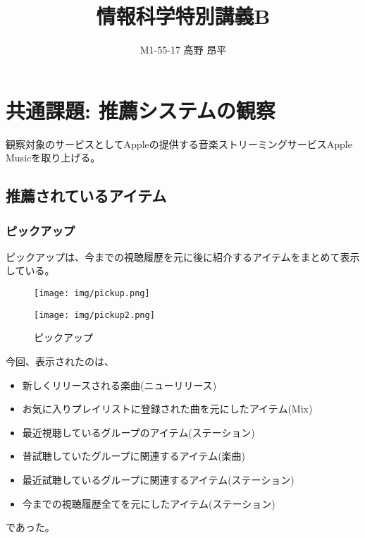 \documentclass{jsarticle}
\title{情報科学特別講義B}
\author{M1-55-17 高野 昂平}
\date{}
\begin{document}
\maketitle
\section{共通課題: 推薦システムの観察}
観察対象のサービスとしてAppleの提供する音楽ストリーミングサービスApple Musicを取り上げる。
\subsection{推薦されているアイテム}
\subsubsection{ピックアップ}
ピックアップは、今までの視聴履歴を元に後に紹介するアイテムをまとめて表示している。
\begin{figure}[htbp]
    \begin{minipage}[b]{0.48\linewidth}
        \begin{center}
            \texttt{[image: img/pickup.png]}
        \end{center}
    \end{minipage}
    \begin{minipage}[b]{0.48\linewidth}
        \begin{center}
            \texttt{[image: img/pickup2.png]}
        \end{center}
    \end{minipage}
    \caption{ピックアップ}
    \label{fig:pickup}
\end{figure}
\par 今回、表示されたのは、
\begin{itemize}
    \item 新しくリリースされる楽曲(ニューリリース)
    \item お気に入りプレイリストに登録された曲を元にしたアイテム(Mix)
    \item 最近視聴しているグループのアイテム(ステーション)
    \item 昔試聴していたグループに関連するアイテム(楽曲)
    \item 最近試聴しているグループに関連するアイテム(ステーション)
    \item 今までの視聴履歴全てを元にしたアイテム(ステーション)
\end{itemize}
であった。
\end{document}
